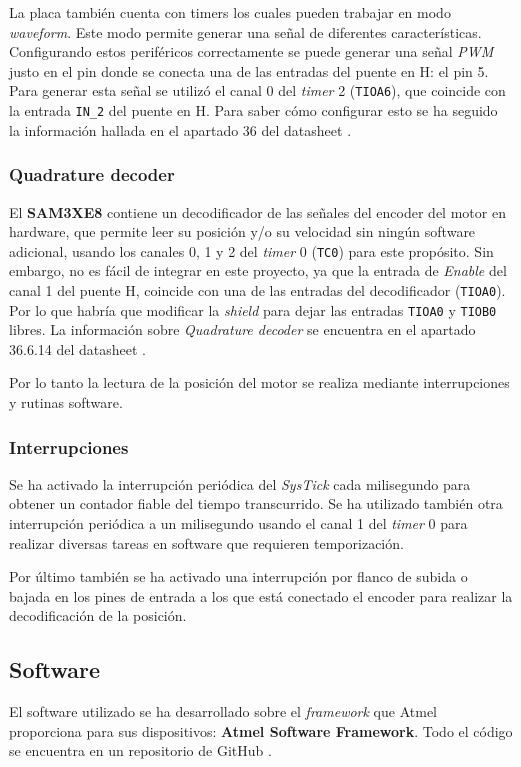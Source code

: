 \documentclass[a4paper]{article}
\begin{document}
La placa también cuenta con timers los cuales pueden trabajar en modo \emph{waveform}.
Este modo permite generar una señal de diferentes características.
Configurando estos periféricos correctamente se puede generar una señal \emph{PWM} justo en el pin donde se conecta una de las entradas del puente en H: el pin 5.
Para generar esta señal se utilizó el canal 0 del \emph{timer} 2 (\texttt{TIOA6}), que coincide con la entrada \texttt{IN\_2} del puente en H. Para saber cómo configurar esto
se ha seguido la información hallada en el apartado 36 del datasheet \cite{SAM3X/A}.

\subsubsection{Quadrature decoder}
El \textbf{SAM3XE8} contiene un decodificador de las señales del encoder del motor en hardware,
que permite leer su posición y/o su velocidad sin ningún software adicional, usando los canales 0, 1 y 2 del \emph{timer} 0 (\texttt{TC0}) para este propósito.
Sin embargo, no es fácil de integrar en este proyecto, ya que la entrada de \emph{Enable} del canal 1 del puente H, coincide con una de las entradas del decodificador (\texttt{TIOA0}).
Por lo que habría que modificar la \emph{shield} para dejar las entradas \texttt{TIOA0} y \texttt{TIOB0} libres. La información sobre \emph{Quadrature decoder} se encuentra en el apartado
36.6.14 del datasheet \cite{SAM3X/A}.

Por lo tanto la lectura de la posición del motor se realiza mediante interrupciones y rutinas software.

\subsubsection{Interrupciones \label{int}}
Se ha activado la interrupción periódica del \emph{SysTick} cada milisegundo para obtener un contador fiable del tiempo transcurrido.
Se ha utilizado también otra interrupción periódica a un milisegundo usando el canal 1 del \emph{timer} 0 para realizar diversas tareas en software que requieren temporización.

Por último también se ha activado una interrupción por flanco de subida o bajada en los pines de entrada a los que está conectado el encoder para realizar la decodificación de la posición.

\subsection{Software \label{sec:software}}
El software utilizado se ha desarrollado sobre el \emph{framework} \cite{framework} que Atmel proporciona para sus dispositivos: \textbf{Atmel Software Framework}.
Todo el código se encuentra en un repositorio de GitHub \cite{git}.
\end{document}
